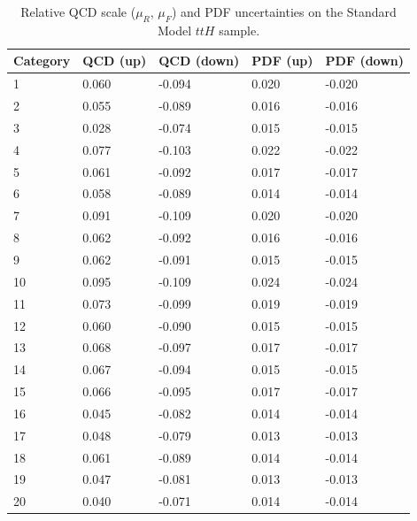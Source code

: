 \begin{table}[ht]
\begin{center}
\begin{tabular}{lllll}
Category & QCD (up) & QCD (down) & PDF (up) & PDF (down) \\ \hline
1  &     0.060 &      -0.094 &   0.020 &    -0.020 \\
2  &     0.055 &      -0.089 &   0.016 &    -0.016 \\
3  &     0.028 &      -0.074 &   0.015 &    -0.015 \\
4  &     0.077 &      -0.103 &   0.022 &    -0.022 \\
5  &     0.061 &      -0.092 &   0.017 &    -0.017 \\
6  &     0.058 &      -0.089 &   0.014 &    -0.014 \\
7  &     0.091 &      -0.109 &   0.020 &    -0.020 \\
8  &     0.062 &      -0.092 &   0.016 &    -0.016 \\
9  &     0.062 &      -0.091 &   0.015 &    -0.015 \\
10 &     0.095 &      -0.109 &   0.024 &    -0.024 \\
11 &     0.073 &      -0.099 &   0.019 &    -0.019 \\
12 &     0.060 &      -0.090 &   0.015 &    -0.015 \\ \hline
13 &     0.068 &      -0.097 &   0.017 &    -0.017 \\
14 &     0.067 &      -0.094 &   0.015 &    -0.015 \\
15 &     0.066 &      -0.095 &   0.017 &    -0.017 \\
16 &     0.045 &      -0.082 &   0.014 &    -0.014 \\
17 &     0.048 &      -0.079 &   0.013 &    -0.013 \\
18 &     0.061 &      -0.089 &   0.014 &    -0.014 \\
19 &     0.047 &      -0.081 &   0.013 &    -0.013 \\
20 &     0.040 &      -0.071 &   0.014 &    -0.014 \\ \hline
\hline
\end{tabular}
\end{center}
\vspace{-0.5cm}
\caption{Relative QCD scale ($\mu_R$, $\mu_F$) and PDF uncertainties on the Standard Model $ttH$ sample.}
\label{tab:qcdpdf_ttH}
\end{table}

